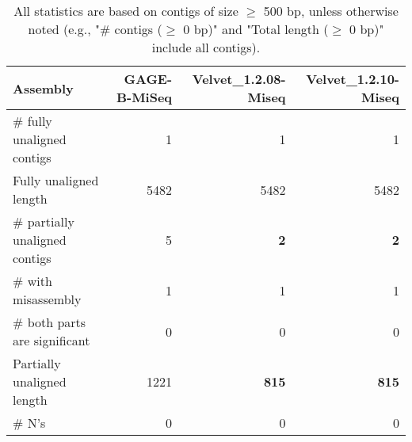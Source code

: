 \documentclass[12pt,a4paper]{article}
\begin{document}
\begin{table}[ht]
\begin{center}
\caption{All statistics are based on contigs of size $\geq$ 500 bp, unless otherwise noted (e.g., "\# contigs ($\geq$ 0 bp)" and "Total length ($\geq$ 0 bp)" include all contigs).}
\begin{tabular}{|l*{3}{|r}|}
\hline
Assembly & GAGE-B-MiSeq & Velvet\_1.2.08-Miseq & Velvet\_1.2.10-Miseq \\ \hline
\# fully unaligned contigs & 1 & 1 & 1 \\ \hline
Fully unaligned length & 5482 & 5482 & 5482 \\ \hline
\# partially unaligned contigs & 5 & {\bf 2} & {\bf 2} \\ \hline
\hspace{5mm}\# with misassembly & 1 & 1 & 1 \\ \hline
\hspace{5mm}\# both parts are significant & 0 & 0 & 0 \\ \hline
Partially unaligned length & 1221 & {\bf 815} & {\bf 815} \\ \hline
\# N's & 0 & 0 & 0 \\ \hline
\end{tabular}
\end{center}
\end{table}
\end{document}
